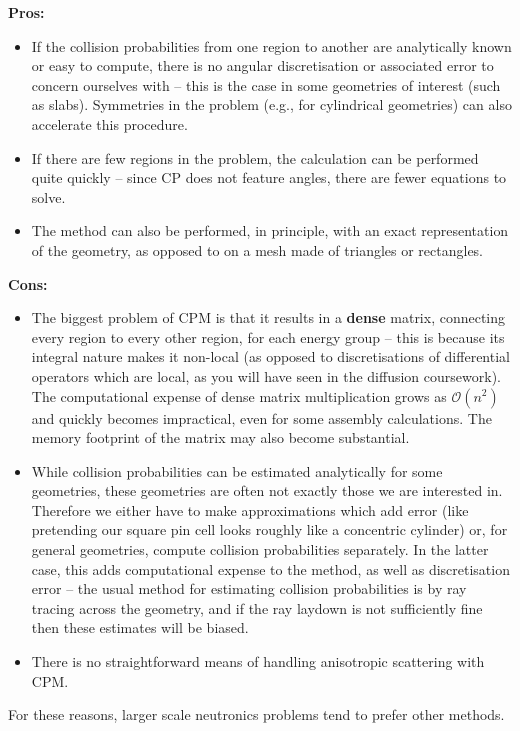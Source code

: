 \documentclass{article}
\begin{document}
\textbf{Pros:} 
\begin{itemize}
    \item If the collision probabilities from one region to another are analytically known or easy to compute, there is no angular discretisation or associated error to concern ourselves with -- this is the case in some geometries of interest (such as slabs). Symmetries in the problem (e.g., for cylindrical geometries) can also accelerate this procedure.
    \item If there are few regions in the problem, the calculation can be performed quite quickly -- since CP does not feature angles, there are fewer equations to solve.
    \item The method can also be performed, in principle, with an exact representation of the geometry, as opposed to on a mesh made of triangles or rectangles.
\end{itemize} 

\textbf{Cons:} 
\begin{itemize}
    \item The biggest problem of CPM is that it results in a \textbf{dense} matrix, connecting every region to every other region, for each energy group -- this is because its integral nature makes it non-local (as opposed to discretisations of differential operators which are local, as you will have seen in the diffusion coursework). The computational expense of dense matrix multiplication grows as $\mathcal{O}(n^2)$ and quickly becomes impractical, even for some assembly calculations. The memory footprint of the matrix may also become substantial.
    \item While collision probabilities can be estimated analytically for some geometries, these geometries are often not exactly those we are interested in. Therefore we either have to make approximations which add error (like pretending our square pin cell looks roughly like a concentric cylinder) or, for general geometries, compute collision probabilities separately. In the latter case, this adds computational expense to the method, as well as discretisation error -- the usual method for estimating collision probabilities is by ray tracing across the geometry, and if the ray laydown is not sufficiently fine then these estimates will be biased.
    \item There is no straightforward means of handling anisotropic scattering with CPM.
\end{itemize}

For these reasons, larger scale neutronics problems tend to prefer other methods.
\end{document}
